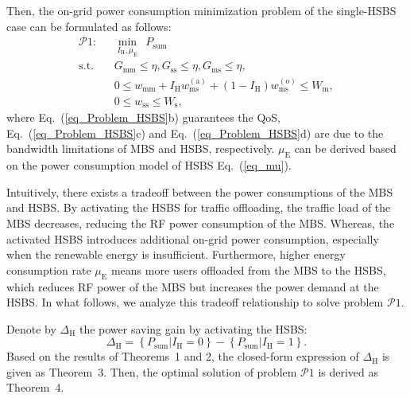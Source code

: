 \documentclass[12pt, draftclsnofoot,onecolumn]{IEEEtran}
\begin{document}
Then, the on-grid power consumption minimization problem of the single-HSBS case can be formulated as follows:
\begin{subequations}\label{eq_Problem_HSBS}
    \begin{align}
    \mathcal{P}1:~~~&\min\limits_{I_\mathrm{H},\mu_\mathrm{E}} ~~P_{\mathrm{sum}} \\
    \mbox{s.t.}~~~ & G_\mathrm{mm}\leq \eta, G_\mathrm{ss}\leq \eta, G_\mathrm{ms} \leq \eta, \\
                & 0 \!\leq \! w_\mathrm{mm} \!+\! I_\mathrm{H} w_\mathrm{ms}^{(\mathrm{a})} \!+\!  (1-I_\mathrm{H}) w_\mathrm{ms}^{(\mathrm{o})} \!\leq\! W_\mathrm{m}, \\
                & 0\leq w_\mathrm{ss} \leq W_\mathrm{s},
    \end{align}
\end{subequations}
where Eq.~(\ref{eq_Problem_HSBS}b) guarantees the QoS, Eq.~(\ref{eq_Problem_HSBS}c) and  Eq.~(\ref{eq_Problem_HSBS}d) are due to the bandwidth limitations of MBS and HSBS, respectively. $\mu_\mathrm{E}$ can be derived based on the power consumption model of HSBS Eq.~(\ref{eq_mu}).

Intuitively, there exists a tradeoff between the power consumptions of the MBS and HSBS.
By activating the HSBS for traffic offloading, the traffic load of the MBS decreases, reducing the RF power consumption of the MBS.
Whereas, the activated HSBS introduces additional on-grid power consumption, especially when the renewable energy is insufficient.
Furthermore, higher energy consumption rate $\mu_\mathrm{E}$ means more users offloaded from the MBS to the HSBS, which reduces RF power of the MBS but increases the power demand at the HSBS.
In what follows, we analyze this tradeoff relationship to solve problem $\mathcal{P}1$.

Denote by $\Delta_\mathrm{H}$ the power saving gain by activating the HSBS:
\begin{equation}\label{eq_P_gain_HSBS_definition}
    \Delta_\mathrm{H} = \left\{P_{\mathrm{sum}}|I_\mathrm{H}=0\right\} - \left\{P_{\mathrm{sum}}|I_\mathrm{H}=1\right\}.
\end{equation}
Based on the results of Theorems~1 and 2, the closed-form expression of $\Delta_\mathrm{H}$ is given as Theorem~3.
Then, the optimal solution of problem $\mathcal{P}1$ is derived as Theorem~4.
\end{document}
